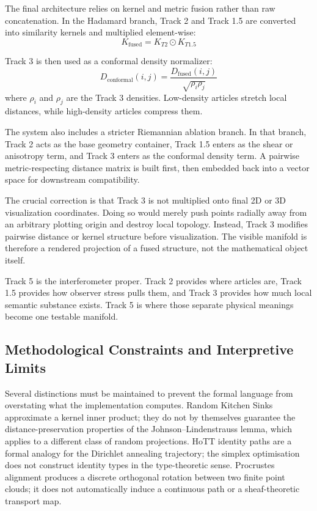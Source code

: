 The final architecture relies on kernel and metric fusion rather than raw concatenation. In the Hadamard branch, Track 2 and Track 1.5 are converted into similarity kernels and multiplied element-wise:
\begin{equation}
    K_{\text{fused}} = K_{T2} \odot K_{T1.5}
\end{equation}

Track 3 is then used as a conformal density normalizer:
\begin{equation}
    D_{\text{conformal}}(i,j) = \frac{D_{\text{fused}}(i,j)}{\sqrt{\rho_i \rho_j}}
\end{equation}
where $\rho_i$ and $\rho_j$ are the Track 3 densities. Low-density articles stretch local distances, while high-density articles compress them.

The system also includes a stricter Riemannian ablation branch. In that branch, Track 2 acts as the base geometry container, Track 1.5 enters as the shear or anisotropy term, and Track 3 enters as the conformal density term. A pairwise metric-respecting distance matrix is built first, then embedded back into a vector space for downstream compatibility.

The crucial correction is that Track 3 is not multiplied onto final 2D or 3D visualization coordinates. Doing so would merely push points radially away from an arbitrary plotting origin and destroy local topology. Instead, Track 3 modifies pairwise distance or kernel structure before visualization. The visible manifold is therefore a rendered projection of a fused structure, not the mathematical object itself.

Track 5 is the interferometer proper. Track 2 provides where articles are, Track 1.5 provides how observer stress pulls them, and Track 3 provides how much local semantic substance exists. Track 5 is where those separate physical meanings become one testable manifold.

\subsection{Methodological Constraints and Interpretive Limits}

Several distinctions must be maintained to prevent the formal language from overstating what the implementation computes. Random Kitchen Sinks approximate a kernel inner product; they do not by themselves guarantee the distance-preservation properties of the Johnson--Lindenstrauss lemma, which applies to a different class of random projections. HoTT identity paths are a formal analogy for the Dirichlet annealing trajectory; the simplex optimisation does not construct identity types in the type-theoretic sense. Procrustes alignment produces a discrete orthogonal rotation between two finite point clouds; it does not automatically induce a continuous path or a sheaf-theoretic transport map.

